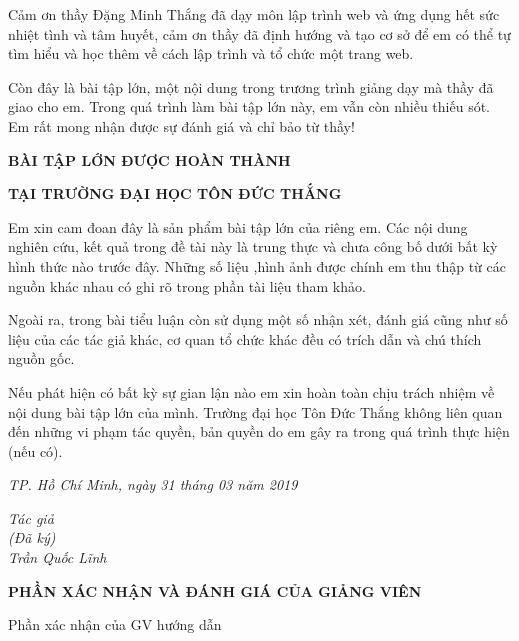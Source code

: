 \documentclass{report}
\begin{document}
\changefontsizes{13pt}
\bigskip
\setlength{\parindent}{2cm}

Cảm ơn thầy Đặng Minh Thắng đã dạy môn lập trình web và ứng dụng hết sức nhiệt tình và tâm huyết, cảm ơn thầy đã định hướng và tạo cơ sở để em có thể tự tìm hiểu và học thêm về cách lập trình và tổ chức một trang web.

Còn đây là bài tập lớn, một nội dung trong trương trình giảng dạy mà thầy đã giao cho em. Trong quá trình làm bài tập lớn này, em vẫn còn nhiều thiếu sót. Em rất mong nhận được sự đánh giá và chỉ bảo từ thầy!
    
\newpage
\changefontsizes{16pt}
\centerline{\textbf{BÀI TẬP LỚN ĐƯỢC HOÀN THÀNH}}
\centerline{\textbf{TẠI TRƯỜNG ĐẠI HỌC TÔN ĐỨC THẮNG}}
\changefontsizes{13pt}
\vspace{1cm}
\setlength{\parindent}{2cm}
Em xin cam đoan đây là sản phẩm bài tập lớn của riêng em. Các nội dung nghiên cứu, kết quả trong đề tài này là trung thực và chưa công bố dưới bất kỳ hình thức nào trước đây. Những số liệu ,hình ảnh được chính em thu thập từ các nguồn khác nhau có ghi rõ trong phần tài liệu tham khảo.

\setlength{\parindent}{2cm}
Ngoài ra, trong bài tiểu luận còn sử dụng một số nhận xét, đánh giá cũng như số liệu của các tác giả khác, cơ quan tổ chức khác đều có trích dẫn và chú thích nguồn gốc.

\setlength{\parindent}{2cm}
Nếu phát hiện có bất kỳ sự gian lận nào em xin hoàn toàn chịu trách nhiệm về nội dung bài tập lớn của mình. Trường đại học Tôn Đức Thắng không liên quan đến những vi phạm tác quyền, bản quyền do em gây ra trong quá trình thực hiện (nếu có).

\vspace{0.75cm}
\begin{flushright}
\renewcommand{\baselinestretch}{0.05}
\changefontsizes{13pt}
\textit{TP. Hồ Chí Minh, ngày 31 tháng 03 năm 2019}
\end{flushright}

\setlength{\parindent}{12cm}
\textit{Tác giả }\\

\setlength{\parindent}{12cm}
\textit{(Đã ký)}\\

\setlength{\parindent}{11.25cm}
\textit{Trần Quốc Lĩnh}\\



\newpage
\changefontsizes{16pt}
\centerline{\textbf{PHẦN XÁC NHẬN VÀ ĐÁNH GIÁ CỦA GIẢNG VIÊN}}
\bigskip
\changefontsizes{13pt}
\setlength{\parindent}{2.2cm}
Phần xác nhận của GV hướng dẫn
\end{document}
